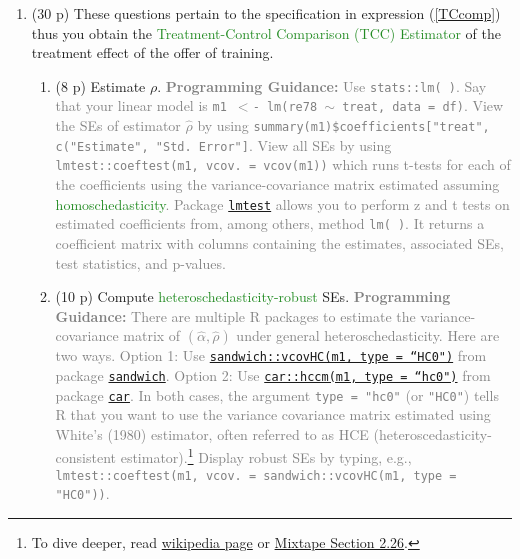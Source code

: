\documentclass{article}
\begin{document}
\setlength{\abovedisplayskip}{0pt}
\setlength{\belowdisplayskip}{-10pt}
\setlength{\abovedisplayshortskip}{0pt}
\setlength{\belowdisplayshortskip}{0pt}


\begin{enumerate}[label=\textbf{Q\arabic{enumi}}.,ref=Q\arabic{enumi}, wide=0pt, itemsep=0em, topsep=5pt, labelindent=0pt, resume]
\item (30 p) These questions pertain to the specification in expression (\ref{TCcomp}) thus you obtain the \textcolor{ForestGreen}{Treatment-Control Comparison (TCC) Estimator} of the treatment effect of the offer of training.\label{item:TCcomp} 
\begin{enumerate}

\item (8 p) Estimate $\rho$. \textcolor{gray}{\textbf{Programming Guidance:} Use \texttt{stats::lm( )}. Say that your linear model is \texttt{m1 $<$- lm(re78 $\sim$ treat, data = df)}. View the SEs of estimator $\hat{\rho}$ by using \texttt{summary(m1)\$coefficients["treat", c("Estimate", "Std. Error"]}. View all SEs by using \texttt{lmtest::coeftest(m1, vcov. = vcov(m1))} which runs t-tests for each of the coefficients using the variance-covariance matrix estimated assuming \textcolor{ForestGreen}{homoschedasticity}. Package \href{https://cran.r-project.org/web/packages/lmtest/lmtest.pdf}{\texttt{lmtest}} allows you to perform z and t tests on estimated coefficients from, among others, method \texttt{lm( )}. It returns a coefficient matrix with columns containing the estimates, associated SEs, test statistics, and p-values.}\label{item:TCcomp-rho} 

\item (10 p) Compute \textcolor{ForestGreen}{heteroschedasticity-robust} SEs. \textcolor{gray}{\textbf{Programming Guidance:} There are multiple R packages to estimate the variance-covariance matrix of $(\hat{\alpha},\hat{\rho})$ under general heteroschedasticity. Here are two ways. Option 1: Use \href{https://www.rdocumentation.org/packages/sandwich/versions/2.5-1/topics/vcovHC}{\texttt{sandwich::vcovHC(m1, type = ``HC0")}} from package \href{https://cran.r-project.org/web/packages/sandwich/sandwich.pdf}{\texttt{sandwich}}. Option 2: Use \href{https://www.rdocumentation.org/packages/car/versions/3.0-6/topics/hccm}{\texttt{car::hccm(m1, type = ``hc0")}} from package \href{https://cran.r-project.org/web/packages/car/car.pdf}{\texttt{car}}. In both cases, the argument \texttt{type = "hc0"} (or \texttt{"HC0"}) tells R that you want to use the variance covariance matrix estimated using White's (1980) estimator, often referred to as HCE (heteroscedasticity-consistent estimator).\footnote{To dive deeper, read \href{https://en.wikipedia.org/wiki/Heteroscedasticity-consistent_standard_errors}{wikipedia page} or \href{https://mixtape.scunning.com/02-probability\_and\_regression\#robust-standard-errors}{Mixtape Section 2.26}.} Display robust SEs by typing, e.g., \texttt{lmtest::coeftest(m1, vcov. = sandwich::vcovHC(m1, type = "HC0"))}.}\label{item:TCcomp-ses}


\end{enumerate}
\end{enumerate}
\end{document}
